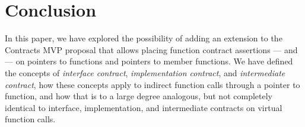 \section{Conclusion}

In this paper, we have explored the possibility of adding an extension to the Contracts MVP proposal \cite{P2900R7} that allows placing function contract assertions ---  and  --- on pointers to functions and pointers to member functions. We have defined the concepts of  \emph{interface contract}, \emph{implementation contract}, and \emph{intermediate contract}, how these concepts apply to indirect function calls through a pointer to function, and how that is to a large degree analogous, but not completely identical to interface, implementation, and intermediate contracts on virtual function calls.

